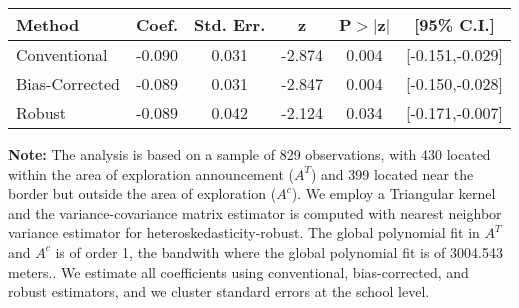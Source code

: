 \begin{table}[htbp]\centering
 \footnotesize 
\begin{tabular}{lccccc}
\hline\hline
Method & Coef. & Std. Err. & z & P$>|$z$|$ & [95\% C.I.] \\ 
\hline \hline  
Conventional & -0.090 & 0.031 & -2.874 & 0.004 & [-0.151,-0.029] \\ 
 Bias-Corrected & -0.089 & 0.031 & -2.847 & 0.004 & [-0.150,-0.028] \\ 
Robust & -0.089 & 0.042 & -2.124 & 0.034 & [-0.171,-0.007] \\ 
  \hline\hline
\end{tabular}
\label{table:rd}
\begin{tablenotes} 
  \justifying \tiny \textbf{Note: }    
   The analysis is based on a sample of 829 observations, with 430 located within the area of exploration announcement ($A^{T}$) and 399 located near the border but outside the area of exploration  ($A^{c}$). 
           We employ a Triangular kernel and the variance-covariance matrix estimator is computed with nearest neighbor variance estimator for heteroskedasticity-robust. The global polynomial fit in  $A^{T}$ and $A^{c}$ is of order 1, the bandwith where the global polynomial fit is of 3004.543 meters.. We estimate all coefficients using conventional, bias-corrected, and robust estimators, and we cluster standard errors at the school level. \end{tablenotes} 
 \end{table} 
